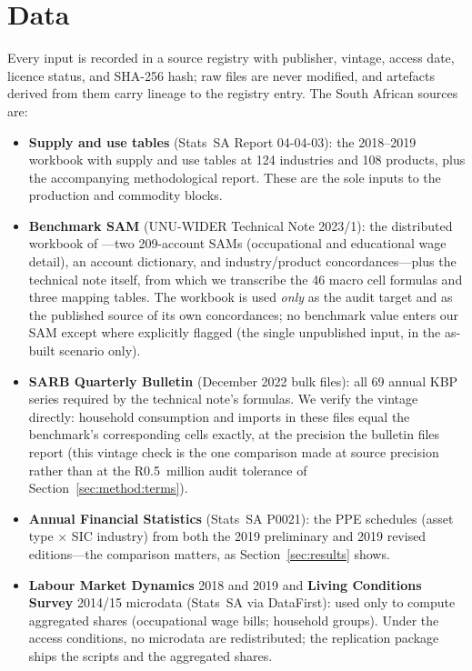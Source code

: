 \section{Data}\label{sec:data}

Every input is recorded in a source registry with publisher, vintage, access
date, licence status, and SHA-256 hash; raw files are never modified, and
artefacts derived from them carry lineage to the registry entry. The South
African sources are:

\begin{itemize}
  \item \textbf{Supply and use tables} (Stats~SA Report 04-04-03): the
  2018--2019 workbook with supply and use tables at 124 industries and 108
  products, plus the accompanying methodological report. These are the sole
  inputs to the production and commodity blocks.
  \item \textbf{Benchmark SAM} (UNU-WIDER Technical Note 2023/1): the
  distributed workbook of \citet{vanseventer2023}---two 209-account SAMs
  (occupational and educational wage detail), an account dictionary, and
  industry/product concordances---plus the technical note itself, from which
  we transcribe the 46 macro cell formulas and three mapping tables. The
  workbook is used \emph{only} as the audit target and as the published
  source of its own concordances; no benchmark value enters our SAM except
  where explicitly flagged (the single unpublished input, in the as-built
  scenario only).
  \item \textbf{SARB Quarterly Bulletin} (December 2022 bulk files): all 69
  annual KBP series required by the technical note's formulas. We verify the
  vintage directly: household consumption and imports in these files equal
  the benchmark's corresponding cells exactly, at the precision the
  bulletin files report (this vintage check is the one comparison made at
  source precision rather than at the R0.5~million audit tolerance of
  Section~\ref{sec:method:terms}).
  \item \textbf{Annual Financial Statistics} (Stats~SA P0021): the PPE
  schedules (asset type $\times$ SIC industry) from both the 2019
  preliminary and 2019 revised editions---the comparison matters, as
  Section~\ref{sec:results} shows.
  \item \textbf{Labour Market Dynamics} 2018 and 2019 and \textbf{Living
  Conditions Survey} 2014/15 microdata (Stats~SA via DataFirst): used only
  to compute aggregated shares (occupational wage bills; household groups).
  Under the access conditions, no microdata are redistributed; the
  replication package ships the scripts and the aggregated shares.
\end{itemize}

